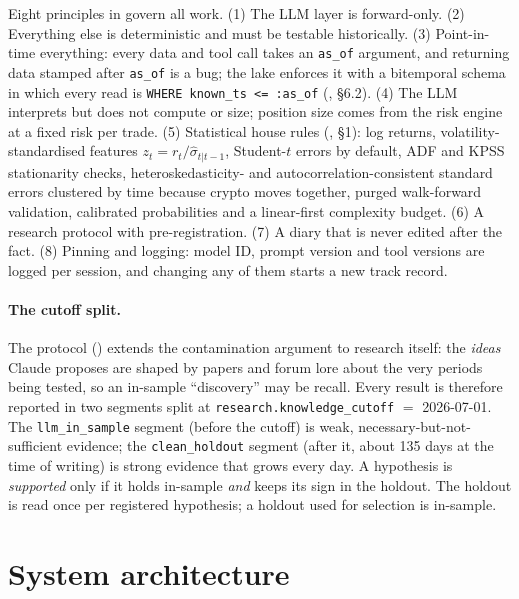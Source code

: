 \documentclass[10pt,a4paper]{article}
\newcommand{\seg}[1]{\texttt{#1}}
\begin{document}
Eight principles in \protect{} govern all work. (1) The LLM layer is forward-only. (2) Everything else is deterministic and must be testable historically. (3) Point-in-time everything: every data and tool call takes an \texttt{as\_of} argument, and returning data stamped after \texttt{as\_of} is a bug; the lake enforces it with a bitemporal schema in which every read is \texttt{WHERE known\_ts <= :as\_of} (\protect{}, \S6.2). (4) The LLM interprets but does not compute or size; position size comes from the risk engine at a fixed risk per trade. (5) Statistical house rules (\protect{}, \S1): log returns, volatility-standardised features $z_t = r_t/\hat\sigma_{t|t-1}$, Student-$t$ errors by default, ADF and KPSS stationarity checks, heteroskedasticity- and autocorrelation-consistent standard errors \citep{neweywest1987} clustered by time because crypto moves together, purged walk-forward validation, calibrated probabilities and a linear-first complexity budget. (6) A research protocol with pre-registration. (7) A diary that is never edited after the fact. (8) Pinning and logging: model ID, prompt version and tool versions are logged per session, and changing any of them starts a new track record.

\paragraph{The cutoff split.} The protocol (\protect{}) extends the contamination argument to research itself: the \emph{ideas} Claude proposes are shaped by papers and forum lore about the very periods being tested, so an in-sample ``discovery'' may be recall. Every result is therefore reported in two segments split at \texttt{research.knowledge\_cutoff} $=$ 2026-07-01. The \seg{llm\_in\_sample} segment (before the cutoff) is weak, necessary-but-not-sufficient evidence; the \seg{clean\_holdout} segment (after it, about 135 days at the time of writing) is strong evidence that grows every day. A hypothesis is \emph{supported} only if it holds in-sample \emph{and} keeps its sign in the holdout. The holdout is read once per registered hypothesis; a holdout used for selection is in-sample.

\section{System architecture}
\end{document}
